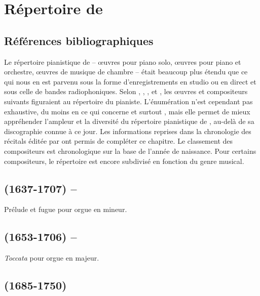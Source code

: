 \chapter[%
Répertoire de Vladimir Sofronickij][%
Répertoire de Vladimir Sofronickij]{%
Répertoire de \VSofronitsky{}}
\label{chap:Repertoire}

\section{Références bibliographiques}

Le répertoire pianistique de \VSofronitsky{} -- œuvres pour piano solo,
œuvres pour piano et orchestre, œuvres de musique de chambre -- était
beaucoup plus étendu que ce qui nous en est parvenu sous la forme
d'enregistrements en studio ou en direct et sous celle de bandes
radiophoniques.
Selon \citet[p.~462-465]{Milshteyn82a}, \citet[p.~72-82]{White},
\citet{Nekrasova08}, \citet{Badeyan10a} et \citet[p.~40-58]{Lajko}, les
œuvres et compositeurs suivants figuraient au répertoire du pianiste.
L'énumération n'est cependant pas exhaustive, du moins en ce qui concerne
\citet{Nekrasova08} et surtout \citet{Badeyan10a}, mais elle permet de mieux
appréhender l'ampleur et la diversité du répertoire pianistique de
\VSofronitsky{}, au-delà de sa discographie connue à ce jour.
Les informations reprises dans la chronologie des récitals éditée par
\citet[p.~393-452]{Scriabine} ont permis de compléter ce chapitre.
Le classement des compositeurs est chronologique sur la base de l'année de
naissance.
Pour certains compositeurs, le répertoire est encore subdivisé en fonction
du genre musical.

\section[%
Dietrich Buxtehude (1637-1707) -- Leonid Nikolaev]{%
\DBuxtehude{} (1637-1707) -- \LNikolaiev{}}

Prélude et fugue pour orgue en \kF \Sharp mineur.

\section[%
Johann Pachelbel (1653-1706) -- Leonid Nikolaev]{%
\JPachelbel{} (1653-1706) -- \LNikolaiev{}}

\emph{Toccata} pour orgue en \kF majeur.

\section[%
Johann Sebastian Bach (1685-1750)]{%
\JBach{} (1685-1750)}

